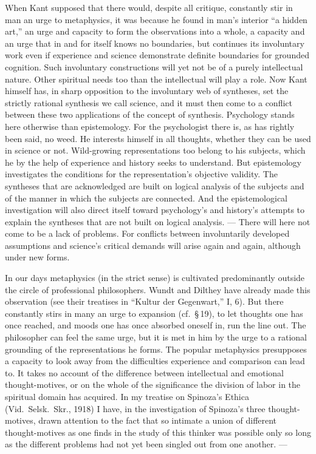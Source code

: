 \documentclass[12pt]{book}
\newcommand{\opage}[1]{\marginnote{\footnotesize\textit{[#1]}}}
\begin{document}
When Kant supposed that there would, despite all critique, constantly stir in man an urge to metaphysics, it was
because he found in man's interior ``a hidden art,'' an urge and capacity to form the observations into a whole, a
capacity and an urge that in and for itself knows no boundaries, but continues its involuntary work even if experience
and science demonstrate definite boundaries for grounded cognition. Such involuntary constructions will yet not be of a
purely intellectual nature. Other spiritual needs too than the intellectual will play a role. Now Kant himself has, in
sharp opposition to the involuntary web of syntheses, set the strictly rational synthesis we call science, and it must
then come to a conflict between these two applications of the concept of synthesis. Psychology stands here otherwise
than epistemology. For the psychologist there is, as has rightly been said, no weed. He interests himself in all
thoughts, whether they can be used in science or not. Wild-growing representations too belong to his subjects, which he
by the help of experience and history seeks to understand. But epistemology investigates \opage{98}the conditions for the
representation's objective validity. The syntheses that are acknowledged are built on logical analysis of the subjects
and of the manner in which the subjects are connected. And the epistemological investigation will also direct itself
toward psychology's and history's attempts to explain the syntheses that are not built on logical analysis. --- There
will here not come to be a lack of problems. For conflicts between involuntarily developed assumptions and science's
critical demands will arise again and again, although under new forms.

In our days metaphysics (in the strict sense) is cultivated predominantly outside the circle of professional
philosophers. Wundt and Dilthey have already made this observation (see their treatises in ``Kultur der Gegenwart,''
I, 6). But there constantly stirs in many an urge to expansion (cf.\ \S\,19), to let thoughts one has once reached, and
moods one has once absorbed oneself in, run the line out. The philosopher can feel the same urge, but it is met in him
by the urge to a rational grounding of the representations he forms. The popular metaphysics presupposes a capacity to
look away from the difficulties experience and comparison can lead to. It takes no account of the difference between
intellectual and emotional thought-motives, or on the whole of the significance the division of labor in the spiritual
domain has acquired. In my treatise on Spinoza's Ethica (Vid.\ Selsk.\ Skr., 1918) I have, in the investigation of
Spinoza's three thought-motives, drawn attention to the fact that so intimate a union of different thought-motives as one
finds in the study of this thinker was possible only so long as the different problems had not yet been singled out from
one another. ---
\end{document}
